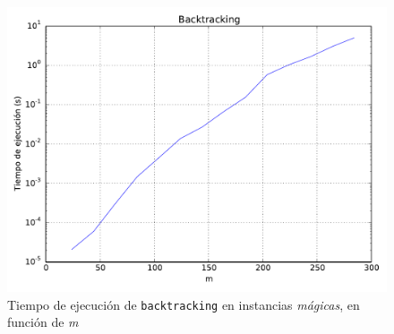 \begin{figure}[H]
    \begin{center}
        \includegraphics[width=\textwidth]{imagenes/backtracking-complejidad-funcion-de-m.pdf}
        \caption{Tiempo de ejecución de \texttt{backtracking} en instancias \textit{mágicas}, en función de \textit{m}}
    \end{center}
\end{figure}
